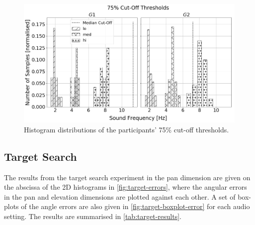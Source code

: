 \documentclass[]{interact}
\begin{document}
\begin{figure}
  \centering
  \includegraphics[width=1.0\textwidth]{figures/pitch_thresholds_limits.png}
  \caption{Histogram distributions of the participants' 75\% cut-off thresholds. }\label{fig:pitch-thresholds-hist}
\end{figure}

\subsection{Target Search}

The results from the target search experiment in the pan dimension are given on the abscissa of the 2D histograms in \cref{fig:target-errors}, where the angular errors in the pan and elevation dimensions are plotted against each other. 
A set of box-plots of the angle errors are also given in \cref{fig:target-boxplot-error} for each audio setting.
The results are summarised in \cref{tab:target-results}.
\end{document}

